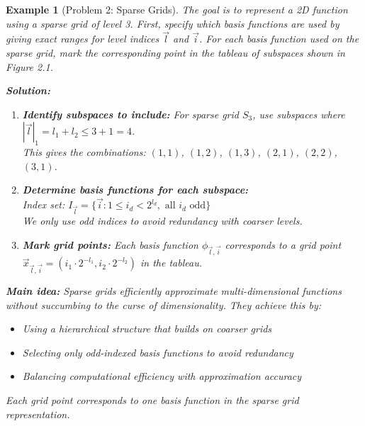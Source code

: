 \documentclass[11pt,a4paper]{article}
\newtheorem{example}[theorem]{Example}
\begin{document}
\begin{example}[Problem 2: Sparse Grids]
    The goal is to represent a 2D function using a sparse grid of level 3. First, specify which basis functions are used by giving exact ranges for level indices $\vec{l}$ and $\vec{i}$. For each basis function used on the sparse grid, mark the corresponding point in the tableau of subspaces shown in Figure 2.1.
    
    \textbf{Solution:}
    \begin{enumerate}
        \item \textbf{Identify subspaces to include:} For sparse grid $S_3$, use subspaces where $|\vec{l}|_1 = l_1 + l_2 \leq 3 + 1 = 4$.\\
        This gives the combinations: $(1,1)$, $(1,2)$, $(1,3)$, $(2,1)$, $(2,2)$, $(3,1)$.
        
        \item \textbf{Determine basis functions for each subspace:} \\
        Index set: $I_{\vec{l}} = \{\vec{i} : 1 \leq i_d < 2^{l_d}, \text{ all } i_d \text{ odd}\}$\\
        We only use odd indices to avoid redundancy with coarser levels.
        
        \item \textbf{Mark grid points:} Each basis function $\phi_{\vec{l},\vec{i}}$ corresponds to a grid point $\vec{x}_{\vec{l},\vec{i}} = (i_1 \cdot 2^{-l_1}, i_2 \cdot 2^{-l_2})$ in the tableau.
    \end{enumerate}
    
    \textbf{Main idea:} Sparse grids efficiently approximate multi-dimensional functions without succumbing to the curse of dimensionality. They achieve this by:
    \begin{itemize}
        \item Using a hierarchical structure that builds on coarser grids
        \item Selecting only odd-indexed basis functions to avoid redundancy
        \item Balancing computational efficiency with approximation accuracy
    \end{itemize}
    Each grid point corresponds to one basis function in the sparse grid representation.
\end{example}
\end{document}

